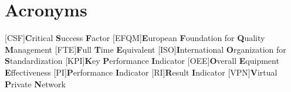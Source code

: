 \pagestyle{plain}
{}
\listoffigures
\label{sec:Figures}

\newpage

\section*{Acronyms}
\label{sec:Acronym}

\begin{acronym}[EFQM]
	[CSF]{\textbf{C}ritical \textbf{S}uccess \textbf{F}actor}
	[EFQM]{\textbf{E}uropean \textbf{F}oundation for \textbf{Q}uality \textbf{M}anagement}
	[FTE]{\textbf{F}ull \textbf{T}ime \textbf{E}quivalent}
	[ISO]{\textbf{I}nternational \textbf{O}rganization for \textbf{S}tandardization}
	[KPI]{\textbf{K}ey \textbf{P}erformance \textbf{I}ndicator}
	[OEE]{\textbf{O}verall \textbf{E}quipment \textbf{E}ffectiveness}
	[PI]{\textbf{P}erformance \textbf{I}ndicator}
	[RI]{\textbf{R}esult \textbf{I}ndicator}
	[VPN]{\textbf{V}irtual \textbf{P}rivate \textbf{N}etwork}
\end{acronym}
